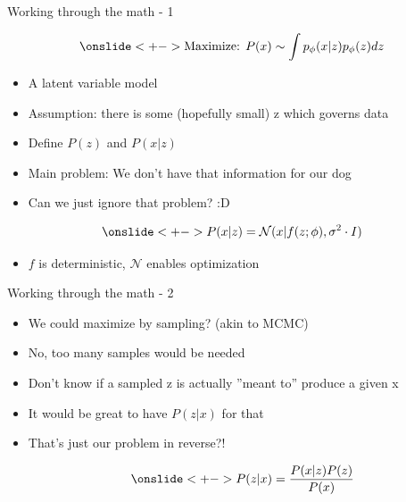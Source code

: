\documentclass[10pt,aspectratio=169]{beamer}
\begin{document}
\begin{frame}{Working through the math - 1}

    \begin{align*}
        \onslide<+->{\text{Maximize: }P(x) \sim \int p_\phi(x|z)p_\phi(z)dz}
    \end{align*}
    \begin{itemize}[<+->]
        \item A latent variable model
        \item Assumption: there is some (hopefully small) z which governs data
        \item Define $P(z)$ and $P(x|z)$
        \item Main problem: We don't have that information for our dog
        \item Can we just ignore that problem? :D
    \end{itemize}
    \begin{align*}
        \onslide<+->{P(x|z) = \mathcal{N}(x|f(z;\phi),\sigma^2 \cdot I)}
    \end{align*}

    \begin{itemize}[<+->]
        \item $f$ is deterministic, $\mathcal{N}$ enables optimization
    \end{itemize}
\end{frame}

\begin{frame}{Working through the math - 2}
    \begin{itemize}[<+->]
        \item We could maximize by sampling? (akin to MCMC)
        \item No, too many samples would be needed
        \item Don't know if a sampled z is actually ''meant to'' produce a given x
        \item It would be great to have $P(z|x)$ for that
        \item That's just our problem in reverse?!

        \begin{align*}
            \onslide<+->{P(z|x) = \frac{P(x|z)P(z)}{P(x)}}
        \end{align*}

    \end{itemize}
    \end{frame}
\end{document}
